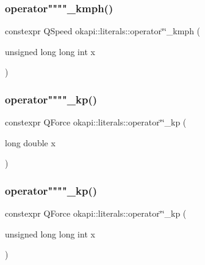 \mbox{\label{namespaceokapi_1_1literals_a34b7a7d505d70d3fddf30234078a3631}} 
\subsubsection{\texorpdfstring{operator""""\_kmph()}{operator""\_kmph()}\hspace{0.1cm}{\footnotesize\ttfamily [2/2]}}
{\footnotesize\ttfamily constexpr Q\+Speed okapi\+::literals\+::operator\char`\"{}\char`\"{}\+\_\+kmph (\begin{DoxyParamCaption}\item[{unsigned long long int}]{x }\end{DoxyParamCaption})}

\mbox{\label{namespaceokapi_1_1literals_ada1579c899ee7af6561e231b7f663c94}} 
\subsubsection{\texorpdfstring{operator""""\_kp()}{operator""\_kp()}\hspace{0.1cm}{\footnotesize\ttfamily [1/2]}}
{\footnotesize\ttfamily constexpr Q\+Force okapi\+::literals\+::operator\char`\"{}\char`\"{}\+\_\+kp (\begin{DoxyParamCaption}\item[{long double}]{x }\end{DoxyParamCaption})}

\mbox{\label{namespaceokapi_1_1literals_af0310e1ec8068c11f8aee0d5a2b94a38}} 
\subsubsection{\texorpdfstring{operator""""\_kp()}{operator""\_kp()}\hspace{0.1cm}{\footnotesize\ttfamily [2/2]}}
{\footnotesize\ttfamily constexpr Q\+Force okapi\+::literals\+::operator\char`\"{}\char`\"{}\+\_\+kp (\begin{DoxyParamCaption}\item[{unsigned long long int}]{x }\end{DoxyParamCaption})}

